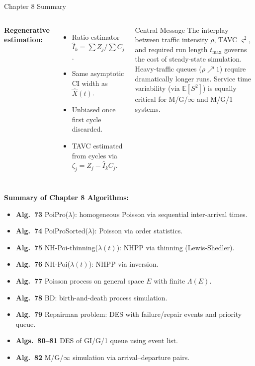 \documentclass[aspectratio=169,10pt]{beamer}
\newcommand{\E}{\mathbb{E}}
\begin{document}
\begin{frame}[allowframebreaks]{Chapter 8 Summary}
\begin{columns}
  \textbf{Regenerative estimation:}
  \begin{itemize}
    \item Ratio estimator $\hat{I}_k = \sum Z_j / \sum C_j$.
    \item Same asymptotic CI width as $\hat{X}(t)$.
    \item Unbiased once first cycle discarded.
    \item TAVC estimated from cycles via $\zeta_j = Z_j - \hat{I}_k C_j$.
  \end{itemize}

  \begin{alertblock}{Central Message}
  The interplay between traffic intensity $\rho$, TAVC $\varsigma^2$, and
  required run length $t_{\max}$ governs the cost of steady-state simulation.
  Heavy-traffic queues ($\rho \nearrow 1$) require dramatically longer runs.
  Service time variability (via $\E[S^2]$) is equally critical for M/G/$\infty$
  and M/G/1 systems.
  \end{alertblock}
\end{columns}

\framebreak

\textbf{Summary of Chapter 8 Algorithms:}
\begin{itemize}
  \item \textbf{Alg.~73} PoiPro($\lambda$): homogeneous Poisson via sequential
        inter-arrival times.
  \item \textbf{Alg.~74} PoiProSorted($\lambda$): Poisson via order statistics.
  \item \textbf{Alg.~75} NH-Poi-thinning($\lambda(t)$): NHPP via thinning
        (Lewis-Shedler).
  \item \textbf{Alg.~76} NH-Poi($\lambda(t)$): NHPP via inversion.
  \item \textbf{Alg.~77} Poisson process on general space $E$ with finite
        $\Lambda(E)$.
  \item \textbf{Alg.~78} BD: birth-and-death process simulation.
  \item \textbf{Alg.~79} Repairman problem: DES with failure/repair events
        and priority queue.
  \item \textbf{Algs.~80--81} DES of GI/G/1 queue using event list.
  \item \textbf{Alg.~82} M/G/$\infty$ simulation via arrival--departure pairs.
\end{itemize}

\end{frame}
\end{document}
